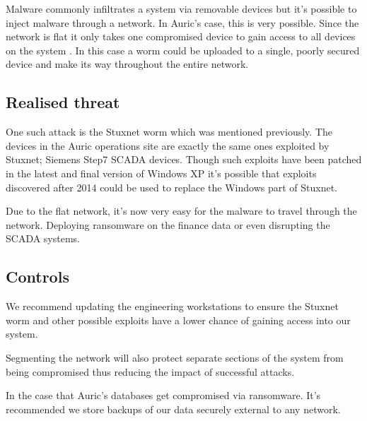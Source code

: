 \documentclass{article}
\begin{document}
\begin{multicols}{2}
    Malware commonly infiltrates a system via removable devices but it's possible
    to inject malware through a network. In Auric's case, this is very possible.
    Since the network is flat it only takes one compromised device to gain access to
    all devices on the system \cite{forbes}.
    In this case a worm could be uploaded to a single,
    poorly secured device and make its way throughout the entire network.

    \subsection{Realised threat}
    One such attack is
    the Stuxnet worm which was mentioned previously. The devices in the Auric
    operations site are exactly the same ones exploited by Stuxnet; Siemens
    Step7 SCADA devices. Though such exploits have been patched in the latest
    and final
    version of Windows XP it's possible that exploits discovered after 2014 
    could be used to replace the Windows part of Stuxnet.

    Due to the flat network,
    it's now very easy for the malware to travel
    through the network. Deploying ransomware on the finance data or even disrupting
    the SCADA systems.

    \subsection{Controls}
    We recommend updating the engineering workstations to ensure
    the Stuxnet worm and other possible exploits have a lower chance of gaining
    access into our system.

    Segmenting the network will also protect separate sections of the system
    from being compromised thus reducing the impact of successful attacks.

    In the case that Auric's databases get compromised via ransomware.
    It's recommended we store backups of our data securely external to any
    network.



\end{multicols}
\end{document}
